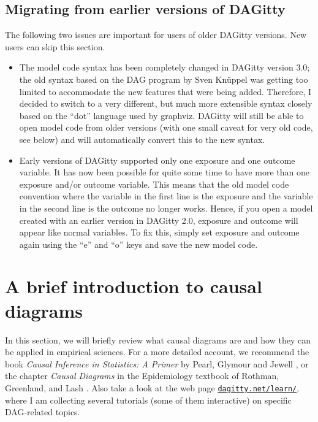 \documentclass[a4paper]{article} %
\newcommand{\pp}{{\sc DAG}itty\xspace}
\begin{document}
\subsection{Migrating from earlier versions of \pp}

The following two issues are important for users of older \pp versions. New users
can skip this section.

\begin{itemize}
\item The model code syntax has been completely changed in DAGitty version 3.0; the old syntax
	based on the DAG program by Sven Kn\"uppel \cite{KnueppelS2010} was getting too limited to accommodate the new features that were being added. Therefore, I decided to switch to a very different, but much more extensible syntax closely based on the ``dot'' language used by graphviz.
\pp will still be able to open model code from older versions (with one small caveat
for very old code, see below) and will automatically convert this to the new syntax.
\item Early versions of DAGitty supported only one exposure and one outcome variable. It has
now been possible for quite some time to have more than one exposure and/or outcome
variable. This means that the old model code convention where the variable in the first line
is the exposure and the variable in the second line is the outcome no longer works. Hence,
if you open a model created with an earlier version in DAGitty 2.0, exposure and outcome
will appear like normal variables. To fix this, simply set exposure and outcome again using
the ``e'' and ``o'' keys and save the new model code.
\end{itemize}

\section{A brief introduction to causal diagrams}

\label{sec:dagintro}

In this section, we will briefly review what causal diagrams are and how they can be 
applied in empirical sciences. For a more detailed account, we recommend 
the book \emph{Causal Inference in Statistics: A Primer} by Pearl, Glymour and Jewell \cite{Pearl2016}, or the chapter \emph{Causal Diagrams} in the Epidemiology 
textbook of Rothman, Greenland, and Lash \cite{RothmanGL2008}. 
Also take a look at the web page \href{http://www.dagitty.net/learn/}{\tt dagitty.net/learn/}, where I am collecting several tutorials (some of them interactive) on specific DAG-related  topics.
 
\end{document}
